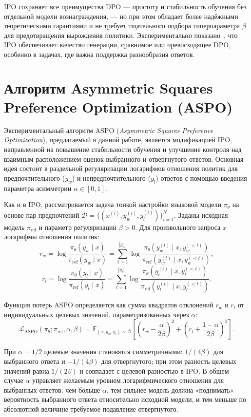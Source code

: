 \documentclass[a4paper,12pt]{article}
\begin{document}
IPO сохраняет все преимущества DPO — простоту и стабильность обучения без отдельной модели вознаграждения, — но при этом обладает более надёжными теоретическими гарантиями и не требует тщательного подбора гиперпараметра $\beta$ для предотвращения вырождения политики. Экспериментально показано~\cite{azar2024general}, что IPO обеспечивает качество генерации, сравнимое или превосходящее DPO, особенно в задачах, где важна поддержка разнообразия ответов.

\section{Алгоритм Asymmetric Squares Preference Optimization (ASPO)}

Экспериментальный алгоритм ASPO (\textit{Asymmetric Squares Preference Optimization}), предлагаемый в данной работе, является модификацией IPO, направленной на повышение стабильности обучения и улучшение контроля над взаимным расположением оценок выбранного и отвергнутого ответов. Основная идея состоит в раздельной регуляризации логарифмов отношения политик для предпочтительного ($y_w$) и непредпочтительного ($y_l$) ответов с помощью введения параметра асимметрии $\alpha \in [0,1]$.

Как и в IPO, рассматривается задача тонкой настройки языковой модели $\pi_\theta$ на основе пар предпочтений $\mathcal{D} = \{(x^{(i)}, y_w^{(i)}, y_l^{(i)})\}_{i=1}^N$. Заданы исходная модель $\pi_{\text{ref}}$ и параметр регуляризации $\beta > 0$. Для произвольного запроса $x$ логарифмы отношения политик:
\[
r_w =  \log \frac{\pi_\theta(y_w \mid x)}{\pi_{\text{ref}}(y_w \mid x)} =\sum_{t=1}^{|y_w|} \log \frac{\pi_\theta(y_w^{(t)} \mid x, y_w^{(<t)})}{\pi_{\text{ref}}(y_w^{(t)} \mid x, y_w^{(<t)})},
\]
\[
r_l = \log \frac{\pi_\theta(y_l \mid x)}{\pi_{\text{ref}}(y_l \mid x)} = \sum_{t=1}^{|y_l|} \log \frac{\pi_\theta(y_l^{(t)} \mid x, y_l^{(<t)})}{\pi_{\text{ref}}(y_l^{(t)} \mid x, y_l^{(<t)})}.
\]

Функция потерь ASPO определяется как сумма квадратов отклонений $r_w$ и $r_l$ от индивидуальных целевых значений, параметризованных через $\alpha$:
\[
\mathcal{L}_{\text{ASPO}}(\pi_\theta; \pi_{\text{ref}}, \alpha, \beta) = \mathbb{E}_{(x, y_w, y_l) \sim \mathcal{D}} \left[ \left( r_w - \frac{\alpha}{2\beta} \right)^2 + \left( r_l + \frac{1 - \alpha}{2\beta} \right)^2 \right]. \tag{1}
\]

При $\alpha = 1/2$ целевые значения становятся симметричными: $1/(4\beta)$ для выбранного ответа и $-1/(4\beta)$ для отвергнутого; при этом разность целевых значений равна $1/(2\beta)$ и совпадает с целевой разностью в IPO. В общем случае $\alpha$ управляет желаемым уровнем логарифмического отношения для выбранных ответов: чем больше $\alpha$, тем сильнее модель должна «поднимать» вероятность выбранного ответа относительно исходной модели, и тем меньше по абсолютной величине требуемое подавление отвергнутого.
\end{document}
